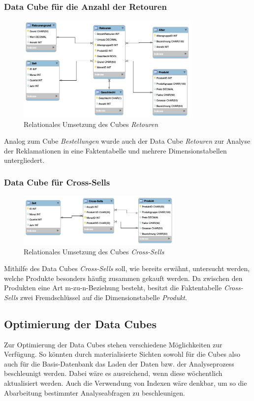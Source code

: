\subsubsection{Data Cube für die Anzahl der Retouren}
\begin{figure}[htbp] 
    \centering
       \includegraphics[width=0.8\textwidth]{phase2/dwh-retouren.png}
    \caption{Relationales Umsetzung des Cubes \textit{Retouren}}
    \label{fig:retouren}
\end{figure}  
Analog zum Cube \textit{Bestellungen} wurde auch der Data Cube \textit{Retouren} zur Analyse der Reklamationen in eine Faktentabelle und mehrere Dimensionstabellen untergliedert. 
  
  
\subsubsection{Data Cube für Cross-Sells}
\begin{figure}[htbp] 
    \centering
       \includegraphics[width=0.72\textwidth]{phase2/dwh-cross.png}
    \caption{Relationales Umsetzung des Cubes \textit{Cross-Sells}}
    \label{fig:bestellungen}
  \end{figure}  
  
Mithilfe des Data Cubes \textit{Cross-Sells} soll, wie bereits erwähnt, untersucht werden, welche Produkte besonders häufig zusammen gekauft werden. Da zwischen den Produkten eine Art m-zu-n-Beziehung besteht, besitzt die Faktentabelle \textit{Cross-Sells} zwei Fremdschlüssel auf die Dimensionstabelle \textit{Produkt}.
  
\subsection{Optimierung der Data Cubes}
Zur Optimierung der Data Cubes stehen verschiedene Möglichkeiten zur Verfügung. So könnten durch materialisierte Sichten sowohl für die Cubes also auch für die Basis-Datenbank das Laden der Daten bzw. der Analyseprozess beschleunigt werden. Dabei wäre es ausreichend, wenn diese wöchentlich aktualisiert werden. Auch die Verwendung von Indexen wäre denkbar, um so die Abarbeitung bestimmter Analyseabfragen zu beschleunigen.